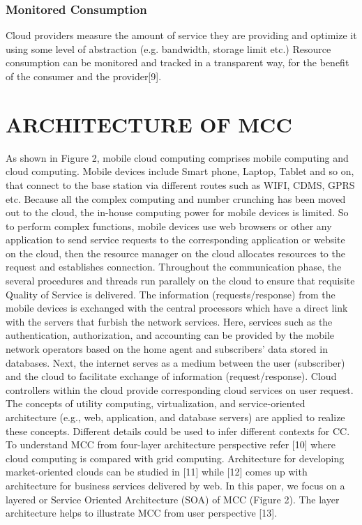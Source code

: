 \documentclass[10pt, conference, compsocconf]{IEEEtran}
\begin{document}
\subsubsection{Monitored Consumption}
Cloud providers measure the amount of service they are providing and optimize it using some level of abstraction (e.g. bandwidth, storage limit etc.) Resource consumption can be monitored and tracked in a transparent way, for the benefit of the consumer and the provider[9].

\section{ARCHITECTURE OF MCC}
As shown in Figure 2, mobile cloud computing comprises mobile computing and cloud computing. Mobile devices include Smart phone, Laptop, Tablet and so on, that connect to the base station via different routes such as WIFI, CDMS, GPRS etc. Because all the complex computing and number crunching has been moved out to the cloud, the in-house computing power for mobile devices is limited. So to perform complex functions, mobile devices use web browsers or other any application to send service requests to the corresponding application or website on the cloud, then the resource manager on the cloud allocates resources to the request and establishes connection. Throughout the communication phase, the several procedures and threads run parallely on the cloud to ensure that requisite Quality of Service is delivered. The information (requests/response) from the mobile devices is exchanged with the central processors which have a direct link with the servers that furbish the network services. Here, services such as the authentication, authorization, and accounting can be provided by the mobile network operators based on the home agent and subscribers’ data stored in databases. Next, the internet serves as a medium between the user (subscriber) and the cloud to facilitate exchange of information (request/response). Cloud controllers within the cloud provide corresponding cloud services on user request. The concepts of utility computing, virtualization, and service-oriented architecture (e.g., web, application, and database servers) are applied to realize these concepts. Different details could be used to infer different contexts for CC. To understand MCC from four-layer architecture perspective refer [10] where cloud computing is compared with grid computing. Architecture for developing market-oriented clouds can be studied in [11] while [12] comes up with architecture for business services delivered by web. In this paper, we focus on a layered or Service Oriented Architecture (SOA) of MCC (Figure 2). The layer architecture helps to illustrate MCC from user perspective [13].
\end{document}
